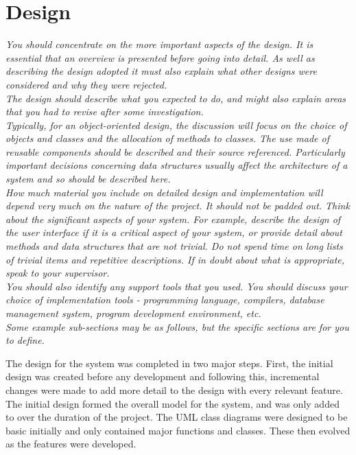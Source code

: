 \chapter{Design}

\textit{You should concentrate on the more important aspects of the design. It is essential that an overview is presented before going into detail. As well as describing the design adopted it must also explain what other designs were considered and why they were rejected.\\
The design should describe what you expected to do, and might also explain areas that you had to revise after some investigation.\\
Typically, for an object-oriented design, the discussion will focus on the choice of objects and classes and the allocation of methods to classes. The use made of reusable components should be described and their source referenced. Particularly important decisions concerning data structures usually affect the architecture of a system and so should be described here.\\
How much material you include on detailed design and implementation will depend very much on the nature of the project. It should not be padded out. Think about the significant aspects of your system. For example, describe the design of the user interface if it is a critical aspect of your system, or provide detail about methods and data structures that are not trivial. Do not spend time on long lists of trivial items and repetitive descriptions. If in doubt about what is appropriate, speak to your supervisor.\\
You should also identify any support tools that you used. You should discuss your choice of implementation tools - programming language, compilers, database management system, program development environment, etc. \\
Some example sub-sections may be as follows, but the specific sections are for you to define.}

The design for the system was completed in two major steps. First, the initial design was created before any development and following this, incremental changes were made to add  more detail to the design with every relevant feature. The initial design formed the overall model for the system, and was only added to over the duration of the project. The UML class diagrams were designed to be basic initially and only contained major functions and classes. These then evolved as the features were developed.

